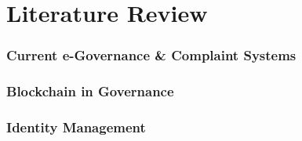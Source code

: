 
\chapter{Literature Review}




\subsection{Current e-Governance & Complaint Systems}
\subsection{Blockchain in Governance}
\subsection{Identity Management}





